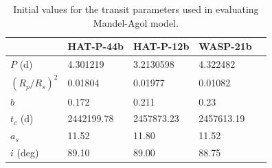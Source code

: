 \begin{table}
\centering
\caption{Initial values for the transit parameters used in evaluating Mandel-Agol model.}\label{tab:init}
\begin{tabular}{lllll} \hline
          &HAT-P-44b      &HAT-P-12b        &WASP-21b   \\ \hline
$P$  (d)         & 4.301219 &3.2130598 &  4.322482\\
$(R_p/R_s)^2$  & 0.01804 & 0.01977 & 0.01082 \\
$b$                 & 0.172 &  0.211 & 0.23 \\
$t_c$ (d)         & 2442199.78 & 2457873.23 &  2457613.19\\
$a_s $                & 11.52 & 11.80 & 11.52 \\
$i$ (deg)          & 89.10 & 89.00 & 88.75 \\ 
\hline
\end{tabular}
\end{table}

